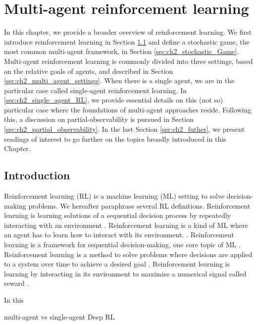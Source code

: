 \chapter{Multi-agent reinforcement learning} \label{ch:marl}

\begin{chapter_outline}

In this chapter, we provide a broader overview of reinforcement learning.
We first introduce reinforcement learning in Section \ref{sec:ch2_Introduction} and define a stochastic game, the most common multi-agent framework, in Section \ref{sec:ch2_stochastic_Game}.
Multi-agent reinforcement learning is commonly divided into three settings, based on the relative goals of agents, and described in Section \ref{sec:ch2_multi_agent_settings}.
When there is a single agent, we are in the particular case called single-agent reinforcement learning.
In \ref{sec:ch2_single_agent_RL}, we provide essential details on this (not so) particular case where the foundations of multi-agent approaches reside.
Following this, a discussion on partial-observability is pursued in Section \ref{sec:ch2_partial_observability}.
In the last Section \ref{sec:ch2_futher}, we present readings of interest to go further on the topics broadly introduced in this Chapter.

\end{chapter_outline}

\section{Introduction} 
\label{sec:ch2_Introduction}
Reinforcement learning (RL) is a machine learning (ML) setting to solve decision-making problems.
We hereafter paraphrase several RL definitions.
Reinforcement learning is learning solutions of a sequential decision process by repeatedly interacting with an environment \citep{marl-book}.
Reinforcement learning is a kind of ML where an agent has to learn how to interact with its environment. \citep{pml1Book}.
Reinforcement learning is a framework for sequential decision-making, one core topic of ML \citep{introDeepRL}.
Reinforcement learning is a method to solve problems where decisions are applied to a system over time to achieve a desired goal \citep{BusoniuErnstBook}.
Reinforcement learning is learning by interacting in its environment to maximise a numerical signal called reward \citep{sutton2018reinforcement}.

In this 

multi-agent vs single-agent
Deep RL


